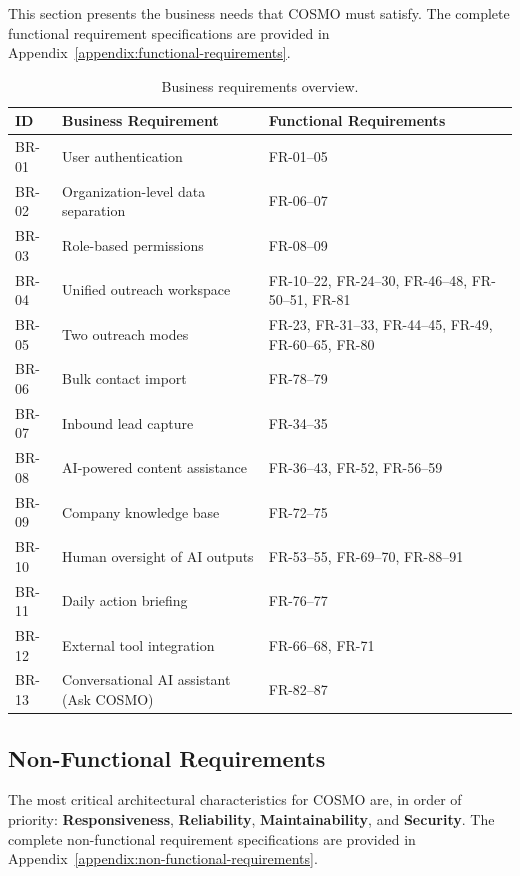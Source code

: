 \documentclass[a4paper]{article}
\begin{document}
This section presents the business needs that COSMO must satisfy.
The complete functional requirement specifications are provided in
Appendix~\ref{appendix:functional-requirements}.

\begin{table}[H]
\centering
\caption{Business requirements overview.}
\begin{tabular}{l p{4cm} p{6cm}}
\toprule
\textbf{ID} & \textbf{Business Requirement} & \textbf{Functional Requirements} \\
\midrule
BR-01 & User authentication & FR-01--05 \\
BR-02 & Organization-level data separation & FR-06--07 \\
BR-03 & Role-based permissions & FR-08--09 \\
BR-04 & Unified outreach workspace & FR-10--22, FR-24--30, FR-46--48, FR-50--51, FR-81 \\
BR-05 & Two outreach modes & FR-23, FR-31--33, FR-44--45, FR-49, FR-60--65, FR-80 \\
BR-06 & Bulk contact import & FR-78--79 \\
BR-07 & Inbound lead capture & FR-34--35 \\
BR-08 & AI-powered content assistance & FR-36--43, FR-52, FR-56--59 \\
BR-09 & Company knowledge base & FR-72--75 \\
BR-10 & Human oversight of AI outputs & FR-53--55, FR-69--70, FR-88--91 \\
BR-11 & Daily action briefing & FR-76--77 \\
BR-12 & External tool integration & FR-66--68, FR-71 \\
BR-13 & Conversational AI assistant (Ask COSMO) & FR-82--87 \\
\bottomrule
\end{tabular}
\end{table}

\subsection{Non-Functional Requirements}

The most critical architectural characteristics for COSMO are, in
order of priority: \textbf{Responsiveness}, \textbf{Reliability},
\textbf{Maintainability}, and \textbf{Security}. The complete
non-functional requirement specifications are provided in
Appendix~\ref{appendix:non-functional-requirements}.
\end{document}
